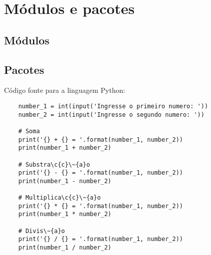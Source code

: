 	
    \section{Módulos e pacotes}



            \subsection{Módulos}



            \subsection{Pacotes}






    Código fonte para a linguagem Python:
    \begin{lstlisting}
    number_1 = int(input('Ingresse o primeiro numero: '))
    number_2 = int(input('Ingresse o segundo numero: '))

    # Soma
    print('{} + {} = '.format(number_1, number_2))
    print(number_1 + number_2)

    # Substra\c{c}\~{a}o
    print('{} - {} = '.format(number_1, number_2))
    print(number_1 - number_2)

    # Multiplica\c{c}\~{a}o
    print('{} * {} = '.format(number_1, number_2))
    print(number_1 * number_2)

    # Divis\~{a}o
    print('{} / {} = '.format(number_1, number_2))
    print(number_1 / number_2)
    \end{lstlisting}





